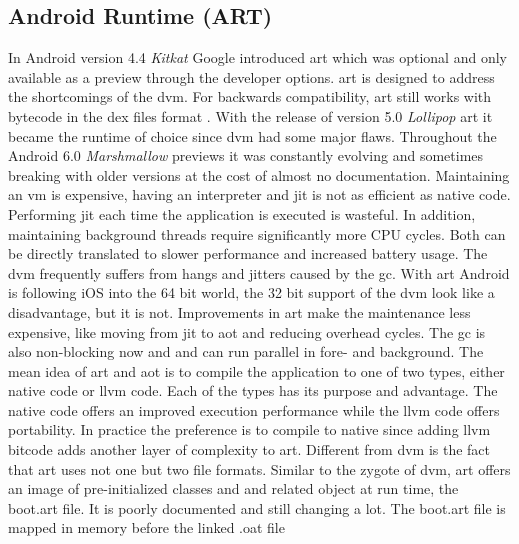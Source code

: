 
\subsection{Android Runtime (ART)} \label{subsection:android-art}
In Android version 4.4 \textit{Kitkat} Google introduced \gls{art} which was optional and only available as a preview through the developer options.
\gls{art} is designed to address the shortcomings of the \gls{dvm}.
\newline
For backwards compatibility, \gls{art} still works with bytecode in the \gls{dex} files format \cite{androidArt}.
With the release of version 5.0 \textit{Lollipop} \gls{art} it became the runtime of choice since \gls{dvm} had some major flaws.
Throughout the Android 6.0 \textit{Marshmallow} previews it was constantly evolving and sometimes breaking with older versions at the cost of almost no documentation.
\newline
Maintaining an \gls{vm} is expensive, having an interpreter and \gls{jit} is not as efficient as native code.
Performing \gls{jit} each time the application is executed is wasteful.
In addition, maintaining background threads require significantly more CPU cycles.
Both can be directly translated to slower performance and increased battery usage.
The \gls{dvm} frequently suffers from hangs and jitters caused by the \gls{gc}.
With \gls{art} Android is following iOS into the 64 bit world, the 32 bit support of the \gls{dvm} look like a disadvantage, but it is not.
\newline
Improvements in \gls{art} make the maintenance less expensive, like moving from \gls{jit} to \gls{aot} and reducing overhead cycles.
The \gls{gc} is also non-blocking now and and can run parallel in fore- and background.
\newline
The mean idea of \gls{art} and \gls{aot} is to compile the application to one of two types, either native code or \gls{llvm} code.
Each of the types has its purpose and advantage.
The native code offers an improved execution performance while the \gls{llvm} code offers portability.
In practice the preference is to compile to native since adding \gls{llvm} bitcode adds another layer of complexity to \gls{art}.
\newline
Different from \gls{dvm} is the fact that \gls{art} uses not one but two file formats.
Similar to the zygote of \gls{dvm}, \gls{art} offers an image of pre-initialized classes and and related object at run time, the boot.art file.
It is poorly documented and still changing a lot.
The boot.art file is mapped in memory before the linked .oat file
